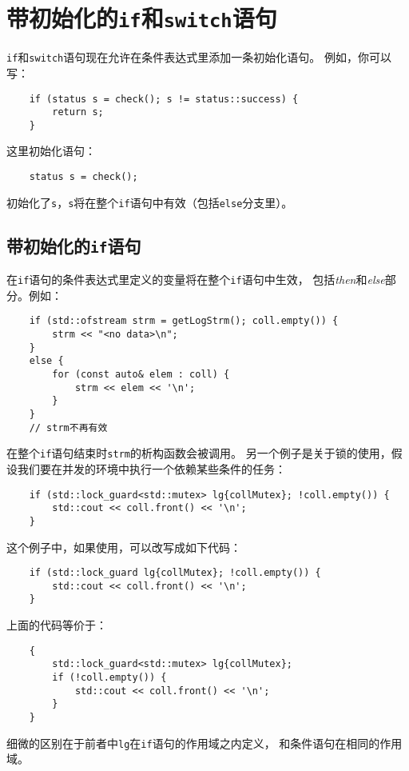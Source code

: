 \section{带初始化的\texttt{if}和\texttt{switch}语句}\label{ch2}
\texttt{if}和\texttt{switch}语句现在允许在条件表达式里添加一条初始化语句。
例如，你可以写：
\begin{lstlisting}
    if (status s = check(); s != status::success) {
        return s;
    }
\end{lstlisting}
这里初始化语句：
\begin{lstlisting}
    status s = check();
\end{lstlisting}
初始化了\texttt{s}，\texttt{s}将在整个\texttt{if}语句中有效（包括\texttt{else}分支里）。

\subsection{带初始化的\texttt{if}语句}
在\texttt{if}语句的条件表达式里定义的变量将在整个\texttt{if}语句中生效，
包括\emph{then}和\emph{else}部分。例如：
\begin{lstlisting}
    if (std::ofstream strm = getLogStrm(); coll.empty()) {
        strm << "<no data>\n";
    }
    else {
        for (const auto& elem : coll) {
            strm << elem << '\n';
        }
    }
    // strm不再有效
\end{lstlisting}
在整个\texttt{if}语句结束时\texttt{strm}的析构函数会被调用。
另一个例子是关于锁的使用，假设我们要在并发的环境中执行一个依赖某些条件的任务：
\begin{lstlisting}
    if (std::lock_guard<std::mutex> lg{collMutex}; !coll.empty()) {
        std::cout << coll.front() << '\n';
    }
\end{lstlisting}
这个例子中，如果使用，可以改写成如下代码：
\begin{lstlisting}
    if (std::lock_guard lg{collMutex}; !coll.empty()) {
        std::cout << coll.front() << '\n';
    }
\end{lstlisting}
上面的代码等价于：
\begin{lstlisting}
    {
        std::lock_guard<std::mutex> lg{collMutex};
        if (!coll.empty()) {
            std::cout << coll.front() << '\n';
        }
    }
\end{lstlisting}
细微的区别在于前者中\texttt{lg}在\texttt{if}语句的作用域之内定义，
和条件语句在相同的作用域。

